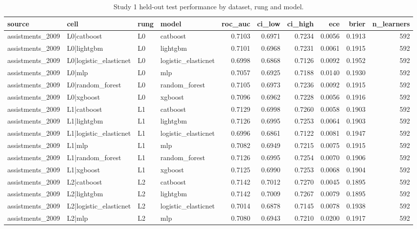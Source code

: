 \begin{table}
\caption{Study 1 held-out test performance by dataset, rung and model.}
\label{tab:model-comparison}
\begin{tabular}{llllrrrrrr}
\toprule
source & cell & rung & model & roc\_auc & ci\_low & ci\_high & ece & brier & n\_learners \\
\midrule
assistments\_2009 & L0|catboost & L0 & catboost & 0.7103 & 0.6971 & 0.7234 & 0.0056 & 0.1913 & 592 \\
assistments\_2009 & L0|lightgbm & L0 & lightgbm & 0.7101 & 0.6968 & 0.7231 & 0.0061 & 0.1915 & 592 \\
assistments\_2009 & L0|logistic\_elasticnet & L0 & logistic\_elasticnet & 0.6998 & 0.6868 & 0.7126 & 0.0092 & 0.1952 & 592 \\
assistments\_2009 & L0|mlp & L0 & mlp & 0.7057 & 0.6925 & 0.7188 & 0.0140 & 0.1930 & 592 \\
assistments\_2009 & L0|random\_forest & L0 & random\_forest & 0.7105 & 0.6973 & 0.7236 & 0.0092 & 0.1915 & 592 \\
assistments\_2009 & L0|xgboost & L0 & xgboost & 0.7096 & 0.6962 & 0.7228 & 0.0056 & 0.1916 & 592 \\
assistments\_2009 & L1|catboost & L1 & catboost & 0.7129 & 0.6998 & 0.7260 & 0.0058 & 0.1903 & 592 \\
assistments\_2009 & L1|lightgbm & L1 & lightgbm & 0.7126 & 0.6995 & 0.7253 & 0.0064 & 0.1903 & 592 \\
assistments\_2009 & L1|logistic\_elasticnet & L1 & logistic\_elasticnet & 0.6996 & 0.6861 & 0.7122 & 0.0081 & 0.1947 & 592 \\
assistments\_2009 & L1|mlp & L1 & mlp & 0.7082 & 0.6949 & 0.7215 & 0.0075 & 0.1915 & 592 \\
assistments\_2009 & L1|random\_forest & L1 & random\_forest & 0.7126 & 0.6995 & 0.7254 & 0.0070 & 0.1906 & 592 \\
assistments\_2009 & L1|xgboost & L1 & xgboost & 0.7125 & 0.6990 & 0.7253 & 0.0068 & 0.1904 & 592 \\
assistments\_2009 & L2|catboost & L2 & catboost & 0.7142 & 0.7012 & 0.7270 & 0.0045 & 0.1895 & 592 \\
assistments\_2009 & L2|lightgbm & L2 & lightgbm & 0.7142 & 0.7009 & 0.7267 & 0.0079 & 0.1895 & 592 \\
assistments\_2009 & L2|logistic\_elasticnet & L2 & logistic\_elasticnet & 0.7014 & 0.6878 & 0.7145 & 0.0078 & 0.1938 & 592 \\
assistments\_2009 & L2|mlp & L2 & mlp & 0.7080 & 0.6943 & 0.7210 & 0.0200 & 0.1917 & 592 \\

\end{tabular}
\end{table}
